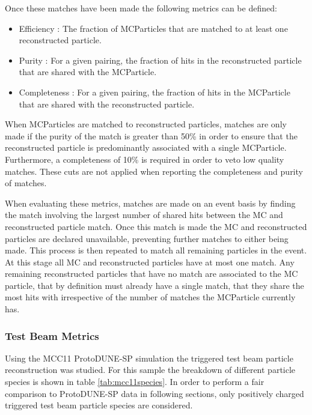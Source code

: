 Once these matches have been made the following metrics can be defined:

\begin{itemize}
    \item Efficiency : The fraction of MCParticles that are matched to at least one reconstructed particle.
    \item Purity : For a given pairing, the fraction of hits in the reconstructed particle that are shared with the MCParticle.
    \item Completeness : For a given pairing, the fraction of hits in the MCParticle that are shared with the reconstructed particle.
\end{itemize}

When MCParticles are matched to reconstructed particles, matches are only made if the purity of the match is greater than 50\% in order to ensure that the reconstructed particle is predominantly associated with a single MCParticle.  Furthermore, a completeness of 10\% is required in order to veto low quality matches.  These cuts are not applied when reporting the completeness and purity of matches.  

When evaluating these metrics, matches are made on an event basis by finding the match involving the largest number of shared hits between the MC and reconstructed particle match.  Once this match is made the MC and reconstructed particles are declared unavailable, preventing further matches to either being made.  This process is then repeated to match all remaining particles in the event.  At this stage all MC and reconstructed particles have at most one match.  Any remaining reconstructed particles that have no match are associated to the MC particle, that by definition must already have a single match, that they share the most hits with irrespective of the number of matches the MCParticle currently has.

\subsubsection{Test Beam Metrics}
Using the MCC11 ProtoDUNE-SP simulation the triggered test beam particle reconstruction was studied. For this sample the breakdown of different particle species is shown in table \ref{tab:mcc11species}.  In order to perform a fair comparison to ProtoDUNE-SP data in following sections, only positively charged triggered test beam particle species are considered.

